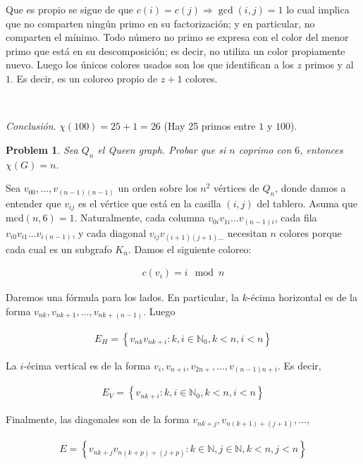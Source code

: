 \documentclass[a4paper, 12pt]{article}
\newtheorem{problem}{Problem}
\newtheorem{problem}{Problem}
\begin{document}
Que es propio se sigue de que $c(i) = c(j) \Rightarrow \gcd(i, j) = 1$ lo cual
implica que no comparten ningún primo en su factorización; y en particular, no
comparten el mínimo. Todo número no primo se expresa con el color del menor
primo que está en su descomposición; es decir, no utiliza un color propiamente
nuevo. Luego los únicos colores usados son los que identifican a los $z$ primos
y al $1$. Es decir, es un coloreo propio de $z + 1$ colores. 

~ 

\textit{Conclusión}. $\chi(100) = 25 + 1 = 26$ (Hay 25 primos entre $1$ y
$100$).

\pagebreak

\begin{problem}
    Sea $Q_n$ el Queen graph. Probar que si $n$ coprimo con $6$, entonces
    $\chi(G) = n$.
\end{problem}

Sea $v_{00}, \ldots, v_{(n-1)(n-1)}$ un orden sobre los $n^2$ vértices de $Q_n$,
donde damos a entender que $v_{ij}$ es el vértice que está en la casilla $(i,
j)$ del tablero. Asuma que $\text{mcd}(n, 6) = 1$. Naturalmente, cada columna
$v_{0i}v_{1i}\ldots v_{(n-1)i}$, cada fila $v_{i 0}v_{i 1}\ldots v_{i (n - 1)}$,
y cada diagonal $v_{ij}v_{(i+1)(j+1) \ldots}$ necesitan $n$ colores porque
cada cual es un subgrafo $K_n$. Damos el siguiente coloreo: 

\begin{align*}
    c(v_i) = i \mod n
\end{align*}




Daremos una
fórmula para los lados. En particular, la $k$-écima horizontal es de la forma
$v_{nk}, v_{nk+1}, \ldots, v_{nk + (n -1)}$. Luego

\begin{align*}
    E_{H} = \left\{ v_{nk} v_{nk + i} : k, i \in  \mathbb{N}_0, k < n, i < n \right\}  
\end{align*}

La $i$-écima vertical es de la forma $v_{i}, v_{n + i}, v_{2n + }, \ldots,
v_{(n - 1)n + i}$. Es decir, 

\begin{align*}
    E_V = \left\{ v_{nk + i} : k, i \in \mathbb{N}_0, k < n, i < n \right\} 
\end{align*}

Finalmente, las diagonales son de la forma $v_{nk + j}, v_{n(k+1) + (j + 1)},
\ldots , $

\begin{align*}
    E = \left\{ v_{nk + j}v_{n(k+p) + (j + p)} : k \in \mathbb{N}, j \in
    \mathbb{N}, k < n, j < n \right\} 
\end{align*}
\end{document}
